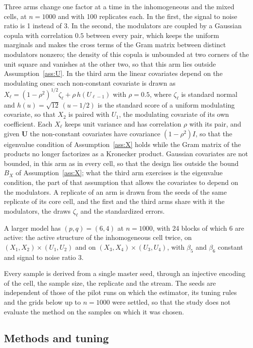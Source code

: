 \documentclass[12pt]{article} %
\theoremstyle{definition}
\theoremstyle{plain}
\newcommand{\cv}{\ell}
\newcommand{\bU}{\mathbf{U}}
\begin{document}
{Three arms change one factor at a time in the inhomogeneous and the mixed
cells, at $n = 1000$ and with 100 replicates each. In the first, the signal to
noise ratio is 1 instead of 3. In the second, the modulators are coupled by a
Gaussian copula with correlation $0.5$ between every pair, which keeps the
uniform marginals and makes the cross terms of the Gram matrix between
distinct modulators nonzero; the density of this copula is unbounded at two
corners of the unit square and vanishes at the other two, so that this arm
lies outside Assumption~\ref{ass:U}. In the third arm the linear covariates
depend on the modulating ones: each non-constant covariate is drawn as
$X_\cv = (1-\rho^2)^{1/2} \zeta_\cv + \rho\, h(U_{\cv-1})$ with $\rho = 0.5$,
where $\zeta_\cv$ is standard normal and $h(u) = \sqrt{12}\,(u - 1/2)$ is the
standard score of a uniform modulating covariate, so that $X_2$ is paired with
$U_1$, the modulating covariate of its own coefficient. Each $X_\cv$ keeps
unit variance and has correlation $\rho$ with its pair, and given $\bU$ the
non-constant covariates have covariance $(1-\rho^2)I$, so that the eigenvalue
condition of Assumption~\ref{ass:X} holds while the Gram matrix of the
products no longer factorizes as a Kronecker product. Gaussian covariates are
not bounded, in this arm as in every cell, so that the design lies outside the
bound $B_X$ of Assumption~\ref{ass:X}; what the third arm exercises is the
eigenvalue condition, the part of that assumption that allows the covariates
to depend on the modulators. A replicate of an arm is drawn from the seeds of
the same replicate of its core cell, and the first and the third arms share
with it the modulators, the draws $\zeta_\cv$ and the standardized errors.

A larger model has $(p,q) = (6,4)$ at $n = 1000$, with 24 blocks of which
6 are active: the active structure of the inhomogeneous cell twice, on
$(X_1,X_2)\times(U_1,U_2)$ and on $(X_3,X_4)\times(U_3,U_4)$, with $\beta_5$
and $\beta_6$ constant and signal to noise ratio 3.

Every sample is derived from a single master seed, through an injective
encoding of the cell, the sample size, the replicate and the stream. The seeds
are independent of those of the pilot runs on which the estimator, its tuning
rules and the grids below up to $n = 1000$ were settled, so that the study does not evaluate
the method on the samples on which it was chosen.

\subsection{Methods and tuning}
\label{sec:sim-methods}

}
\end{document}
